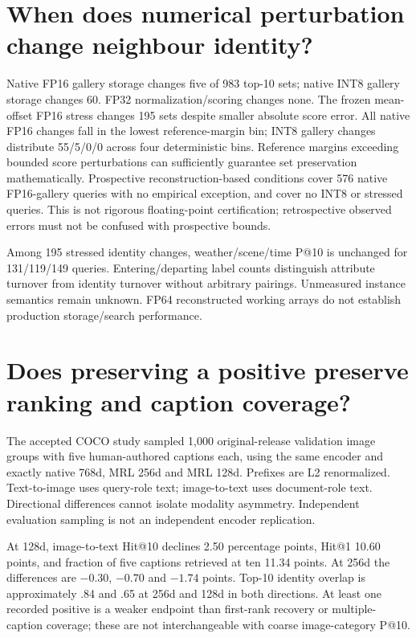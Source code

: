 \documentclass[11pt]{article}
\begin{document}


\section{When does numerical perturbation change neighbour identity?}
\ours{} Native FP16 gallery storage changes five of 983 top-10 sets; native INT8
gallery storage changes 60. FP32 normalization/scoring changes none. The frozen
mean-offset FP16 stress changes 195 sets despite smaller absolute score error.
All native FP16 changes fall in the lowest reference-margin bin; INT8 gallery
changes distribute 55/5/0/0 across four deterministic bins.
\established{} Reference margins exceeding bounded score perturbations can
sufficiently guarantee set preservation mathematically. \ours{} Prospective
reconstruction-based conditions cover 576 native FP16-gallery queries with no
empirical exception, and cover no INT8 or stressed queries.
\interp{} This is not rigorous floating-point certification; retrospective
observed errors must not be confused with prospective bounds.

\ours{} Among 195 stressed identity changes, weather/scene/time P@10 is unchanged
for 131/119/149 queries. \interp{} Entering/departing label counts distinguish
attribute turnover from identity turnover without arbitrary pairings. Unmeasured
instance semantics remain unknown. FP64 reconstructed working arrays do not
establish production storage/search performance.



\section{Does preserving a positive preserve ranking and caption coverage?}
\ours{} The accepted COCO study sampled 1,000 original-release validation image
groups with five human-authored captions each, using the same encoder and exactly
native 768d, MRL 256d and MRL 128d. Prefixes are L2 renormalized. Text-to-image
uses query-role text; image-to-text uses document-role text. Directional differences
cannot isolate modality asymmetry. Independent evaluation sampling is not an
independent encoder replication.


\ours{} At 128d, image-to-text Hit@10 declines 2.50 percentage points, Hit@1
10.60 points, and fraction of five captions retrieved at ten 11.34 points.
At 256d the differences are $-0.30$, $-0.70$ and $-1.74$ points.
Top-10 identity overlap is approximately .84 and .65 at 256d and 128d in both
directions. \interp{} At least one recorded positive is a weaker endpoint than
first-rank recovery or multiple-caption coverage; these are not interchangeable
with coarse image-category P@10.
\end{document}
